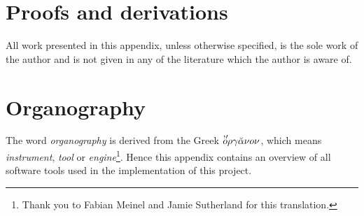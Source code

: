 \documentclass{report}
\begin{document}




\begin{appendix}
\chapter{Proofs and derivations}
All work presented in this appendix, unless otherwise specified, is the sole work
of the author and is not given in any of the literature which the author is aware of.



\chapter*{Organography}
The word \emph{organography} is derived from the Greek
$\mbox{\makebox[0pt]{\raisebox{1.5pt}{\hspace{6pt}'$'$}}} o\rho\gamma\breve{\alpha}\nu o\nu$,
which means \emph{instrument}, \emph{tool} or \emph{engine}\footnote{Thank you to Fabian Meinel
and Jamie Sutherland for this translation.}. Hence this appendix contains an overview of all
software tools used in the implementation of this project.
\end{appendix}

\end{document}
